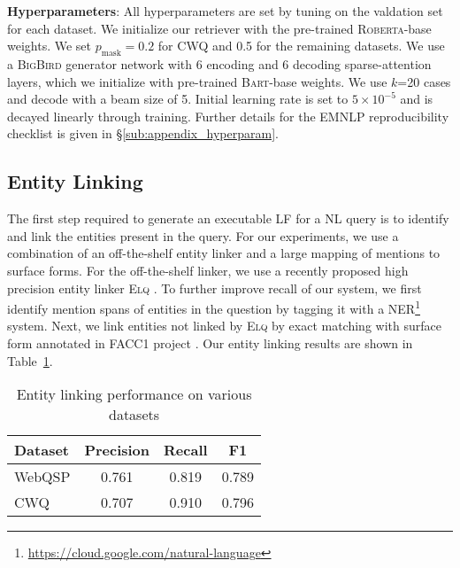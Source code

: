 \documentclass[11pt]{article}
\newcommand{\roberta}{\textsc{Roberta}\xspace}
\newcommand{\bigb}{\textsc{BigBird}\xspace}
\begin{document}
\noindent\textbf{Hyperparameters}: All hyperparameters are set by tuning on the valdation set for each dataset. We initialize our retriever with the pre-trained \roberta-base weights. We set $p_{\textrm{mask}}=0.2$ for CWQ and 0.5 for the remaining datasets. We use a \bigb generator network with 6 encoding and 6 decoding sparse-attention layers, which we initialize with pre-trained \textsc{Bart}-base weights. We use $k$=20 cases and decode with a beam size of 5. Initial learning rate is set to $5\times 10^{-5}$ and is decayed linearly through training. Further details for the EMNLP reproducibility checklist is given in \S\ref{sub:appendix_hyperparam}.


\subsection{Entity Linking}
\label{sub:entity_linking}
The first step required to generate an executable LF for a NL query is to identify and link the entities present in the query. For our experiments, we use a combination of an off-the-shelf entity linker and a large mapping of mentions to surface forms. For the off-the-shelf linker, we use a recently proposed high precision entity linker \textsc{Elq} \cite{li2020efficient}. To further improve recall of our system, we first identify mention spans of entities in the question by tagging it with a NER\footnote{\url{https://cloud.google.com/natural-language}} system. Next, we link entities not linked by \textsc{Elq} by exact matching with surface form annotated in FACC1 project \cite{facc1}. Our entity linking results are shown in Table~\ref{tab:el_results}.
\begin{table}[]
    \centering
    \small
    \begin{tabular}{@{}l c c c@{}}
    \toprule
    Dataset &  Precision & Recall & F1\\\midrule
    WebQSP  & 0.761   & 0.819 & 0.789\\
    CWQ & 0.707 & 0.910 & 0.796\\\bottomrule
    \end{tabular}
    \caption{Entity linking performance on various datasets}
    \label{tab:el_results}
    \vspace{-1em}
\end{table}
\end{document}
